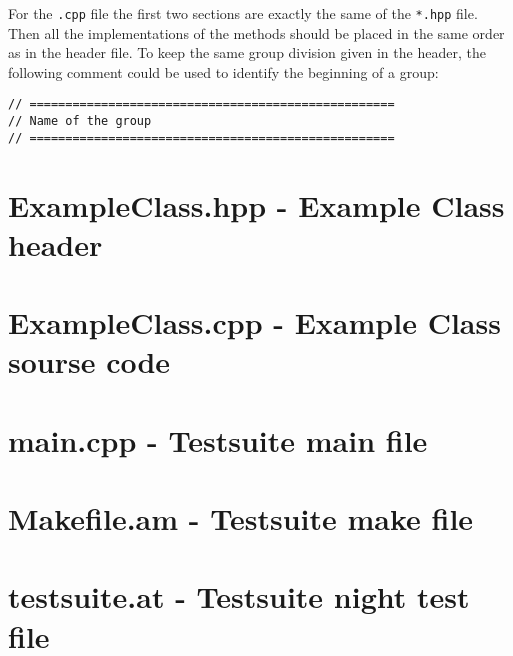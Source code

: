 \documentclass[10p]{article}
\newcommand{\addappendixname}{%
  \renewcommand{\cftchappresnum}{\appendixname\space}%
    \settowidth{\cftchapnumwidth}{\bfseries \appendixname\space A\hspace{1em}}}
\begin{document}
For the \texttt{.cpp} file the first two sections are exactly the same of the \texttt{*.hpp} file. Then all the implementations of the methods should be
placed in the same order as in the header file. To keep the same group division given in the header, the following comment could be used to identify the beginning of a group:
\begin{lstlisting}
// ===================================================
// Name of the group
// ===================================================
\end{lstlisting}

\appendix
\addtocontents{toc}{\protect\addappendixname}
\clearpage


\section{ExampleClass.hpp - Example Class header} \label{TemplateClassHPP}
\small{}

\clearpage
\section{ExampleClass.cpp - Example Class sourse code}
\label{TemplateClassCPP}
\small{}

\clearpage
\section{main.cpp - Testsuite main file} \label{main}
\small{}

\clearpage
\section{Makefile.am - Testsuite make file} \label{Makefileam}
\small{}

\section{testsuite.at - Testsuite night test file} \label{testsuiteat}
\small{}
\end{document}
